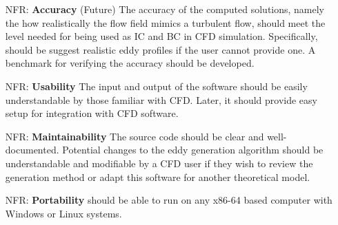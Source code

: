 \documentclass[12pt]{article}
\newcounter{nfrnum} %
\begin{document}
\noindent \begin{itemize}

\item[NFR\refstepcounter{nfrnum}\thenfrnum \label{NFR_Accuracy}:]
  \textbf{Accuracy} (Future) The accuracy of the computed solutions, namely the how realistically the flow field mimics a turbulent flow, should meet the level needed for being used as IC and BC in CFD simulation. Specifically, \progname{} should be suggest realistic eddy profiles if the user cannot provide one. A benchmark for verifying the accuracy should be developed. 

\item[NFR\refstepcounter{nfrnum}\thenfrnum \label{NFR_Usability}:] \textbf{Usability} The input and output of the software should be easily understandable by those familiar with CFD. Later, it should provide easy setup for integration with CFD software.

\item[NFR\refstepcounter{nfrnum}\thenfrnum \label{NFR_Maintainability}:]
  \textbf{Maintainability} The source code should be clear and well-documented. Potential changes to the eddy generation algorithm should be understandable and modifiable by a CFD user if they wish to review the generation method or adapt this software for another theoretical model. 

\item[NFR\refstepcounter{nfrnum}\thenfrnum \label{NFR_Portability}:]
  \textbf{Portability} \progname{} should be able to run on any x86-64 based computer with Windows or Linux systems.


\end{itemize}
\end{document}
